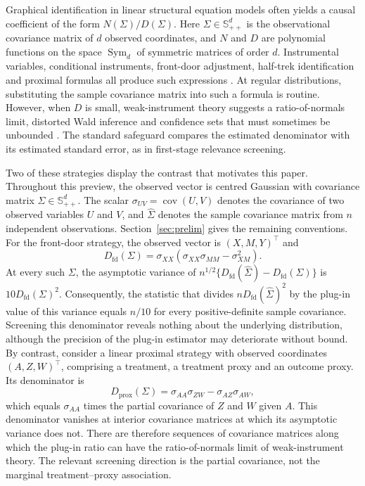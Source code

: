 \documentclass[12pt,a4paper]{article}
\theoremstyle{plain}
\theoremstyle{definition}
\newcommand{\Smat}{\mathbb{S}}
\newcommand{\Sym}{\operatorname{Sym}}
\newcommand{\cov}{\operatorname{cov}}
\newcommand{\Sighat}{\hat{\Sigma}}
\begin{document}
Graphical identification in linear structural equation models often yields a causal coefficient of the form $N(\Sigma)/D(\Sigma)$.
Here $\Sigma\in\Smat^d_{++}$ is the observational covariance matrix of $d$ observed coordinates, and $N$ and $D$ are polynomial functions on the space $\Sym_d$ of symmetric matrices of order $d$.
Instrumental variables, conditional instruments, front-door adjustment, half-trek identification and proximal formulas all produce such expressions \citep{pearl1995,britopearl2002,fdd2012,kurokipearl2014,vanderzander2015,miao2018,tchetgen2024,henckel2024}.
At regular distributions, substituting the sample covariance matrix into such a formula is routine.
However, when $D$ is small, weak-instrument theory suggests a ratio-of-normals limit, distorted Wald inference and confidence sets that must sometimes be unbounded \citep{gleserhwang1987,dufour1997,staiger1997,stockwright2000,andrewscheng2012,andrewsstocksun2019}.
The standard safeguard compares the estimated denominator with its estimated standard error, as in first-stage relevance screening.

Two of these strategies display the contrast that motivates this paper.
Throughout this preview, the observed vector is centred Gaussian with covariance matrix $\Sigma\in\Smat^d_{++}$.
The scalar $\sigma_{UV}=\cov(U,V)$ denotes the covariance of two observed variables $U$ and $V$, and $\Sighat$ denotes the sample covariance matrix from $n$ independent observations.
Section~\ref{sec:prelim} gives the remaining conventions.
For the front-door strategy, the observed vector is $(X,M,Y)^\top$ and
\begin{equation*}
    D_{\mathrm{fd}}(\Sigma)
    =
    \sigma_{XX}(\sigma_{XX}\sigma_{MM}-\sigma_{XM}^2)
    .
\end{equation*}
At every such $\Sigma$, the asymptotic variance of $n^{1/2}\{D_{\mathrm{fd}}(\Sighat)-D_{\mathrm{fd}}(\Sigma)\}$ is $10D_{\mathrm{fd}}(\Sigma)^2$.
Consequently, the statistic that divides $nD_{\mathrm{fd}}(\Sighat)^2$ by the plug-in value of this variance equals $n/10$ for every positive-definite sample covariance.
Screening this denominator reveals nothing about the underlying distribution, although the precision of the plug-in estimator may deteriorate without bound.
By contrast, consider a linear proximal strategy with observed coordinates $(A,Z,W)^\top$, comprising a treatment, a treatment proxy and an outcome proxy.
Its denominator is
\begin{equation*}
    D_{\mathrm{prox}}(\Sigma)
    =
    \sigma_{AA}\sigma_{ZW}-\sigma_{AZ}\sigma_{AW}
    ,
\end{equation*}
which equals $\sigma_{AA}$ times the partial covariance of $Z$ and $W$ given $A$.
This denominator vanishes at interior covariance matrices at which its asymptotic variance does not.
There are therefore sequences of covariance matrices along which the plug-in ratio can have the ratio-of-normals limit of weak-instrument theory.
The relevant screening direction is the partial covariance, not the marginal treatment--proxy association.
\end{document}
